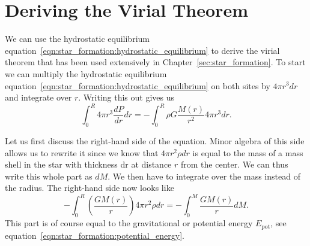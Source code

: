 


\chapter{Deriving the Virial Theorem}\label{app:virial_theorem}

We can use the hydrostatic equilibrium equation~\eqref{eqn:star_formation:hydrostatic_equilibrium} to derive the virial theorem that has been used extensively in Chapter~\ref{sec:star_formation}. To start we can multiply the hydrostatic equilibrium equation~\eqref{eqn:star_formation:hydrostatic_equilibrium} on both sites by $4\pi r^3 dr$ and integrate over $r$. Writing this out gives us
\begin{equation}
    \int_0^R 4\pi r^3 \frac{dP}{dr} dr = - \int_0^R \rho G \frac{M(r)}{r^2} 4\pi r^3 dr.
    \label{eqn:app:vt:starting_equation}
\end{equation}

Let us first discuss the right-hand side of the equation. Minor algebra of this side allows us to rewrite it since we know that $4\pi r^2 \rho dr$ is equal to the mass of a mass shell in the star with thickness dr at distance $r$ from the center. We can thus write this whole part as $dM$. We then have to integrate over the mass instead of the radius. The right-hand side now looks like
\begin{equation}
    -\int_0^R \left(\frac{GM(r)}{r}\right) 4\pi r^2\rho dr = -\int_0^M \frac{GM(r)}{r}dM. 
\end{equation}
This part is of course equal to the gravitational or potential energy $E_\mathrm{pot}$, see equation~\eqref{eqn:star_formation:potential_energy}.


